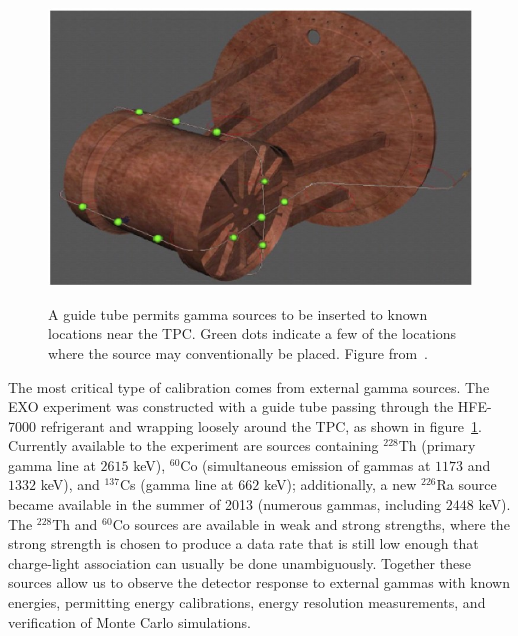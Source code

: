 \begin{figure}
\begin{center}
\includegraphics[keepaspectratio=true,width=\textwidth]{calibration_tube.jpg}
\end{center}
\renewcommand{\baselinestretch}{1}
\small\normalsize
\begin{quote}
\caption{A guide tube permits gamma sources to be inserted to known locations near the TPC.  Green dots indicate a few of the locations where the source may conventionally be placed.  Figure from~\cite{detectorPartI}.}
\label{fig:CalibrationGuideTube}
\end{quote}
\end{figure}
\renewcommand{\baselinestretch}{2}
\small\normalsize

The most critical type of calibration comes from external gamma sources.  The EXO experiment was constructed with a guide tube passing through the HFE-7000 refrigerant and wrapping loosely around the TPC, as shown in figure~\ref{fig:CalibrationGuideTube}.  Currently available to the experiment are sources containing $^{228}$Th (primary gamma line at $2615$ keV), $^{60}$Co (simultaneous emission of gammas at $1173$ and $1332$ keV), and $^{137}$Cs (gamma line at $662$ keV); additionally, a new $^{226}$Ra source became available in the summer of 2013 (numerous gammas, including $2448$ keV).  The $^{228}$Th and $^{60}$Co sources are available in weak and strong strengths, where the strong strength is chosen to produce a data rate that is still low enough that charge-light association can usually be done unambiguously.  Together these sources allow us to observe the detector response to external gammas with known energies, permitting energy calibrations, energy resolution measurements, and verification of Monte Carlo simulations.

